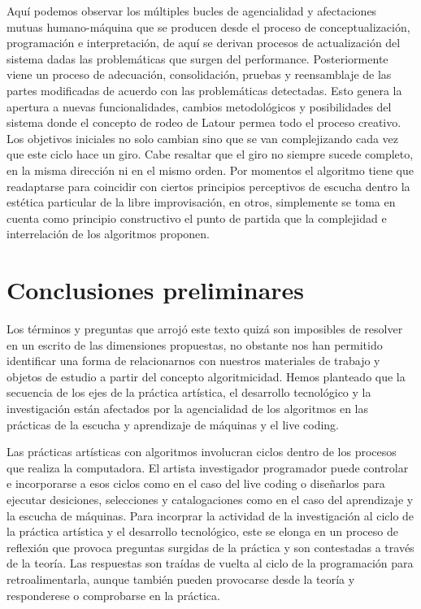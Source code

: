Aquí podemos observar los múltiples bucles de agencialidad y afectaciones mutuas humano-máquina que se producen desde el proceso de conceptualización, programación e interpretación, de aquí se derivan procesos de actualización del sistema dadas las problemáticas que surgen del performance. Posteriormente viene un proceso de adecuación, consolidación, pruebas y reensamblaje de las partes modificadas de acuerdo con las problemáticas detectadas. Esto genera la apertura a nuevas funcionalidades, cambios metodológicos y posibilidades del sistema donde el concepto de rodeo de Latour permea todo el proceso creativo. Los objetivos iniciales no solo cambian sino que se van complejizando cada vez que este ciclo hace un giro. Cabe resaltar que el giro no siempre sucede completo, en la misma dirección ni en el mismo orden. Por momentos el algoritmo tiene que readaptarse para coincidir con ciertos principios perceptivos de escucha dentro la estética particular de la libre improvisación, en otros, simplemente se toma en cuenta como principio constructivo el punto de partida que la complejidad e interrelación de los algoritmos proponen. 


\section{Conclusiones preliminares}

Los términos y preguntas que arrojó este texto quizá son imposibles de resolver en un escrito de las dimensiones propuestas, no obstante nos han permitido identificar una forma de relacionarnos con nuestros materiales de trabajo y objetos de estudio a partir del concepto algoritmicidad. Hemos planteado que la secuencia de los ejes de la práctica artística, el desarrollo tecnológico y la investigación están afectados por la agencialidad de los algoritmos en las prácticas de la escucha y aprendizaje de máquinas y el live coding.

Las prácticas artísticas con algoritmos involucran ciclos dentro de los procesos que realiza la computadora. El artista investigador programador puede controlar e incorporarse a esos ciclos como en el caso del live coding o diseñarlos para ejecutar desiciones, selecciones y catalogaciones como en el caso del aprendizaje y la escucha de máquinas. Para incorprar la actividad de la investigación al ciclo de la práctica artística y el desarrollo tecnológico, este se elonga en un proceso de reflexión que provoca preguntas surgidas de la práctica y son contestadas a través de la teoría. Las respuestas son traídas de vuelta al ciclo de la programación para retroalimentarla, aunque también pueden provocarse desde la teoría y responderese o comprobarse en la práctica.

